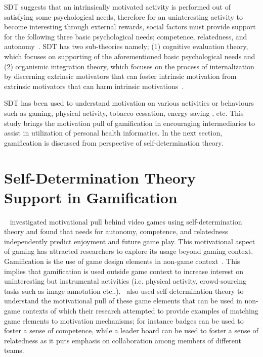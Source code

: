 SDT suggests that an intrinsically motivated activity is performed out of satisfying some psychological needs, therefore for an uninteresting activity to become interesting through external rewards, social factors must provide support for the following three basic psychological needs; competence, relatedness, and autonomy~\citep{ryan2000intrinsic}. SDT has two sub-theories namely; (1) cognitive evaluation theory, which focuses on supporting of the aforementioned basic psychological needs and (2) organismic integration theory, which focuses on the process of internalization by discerning extrinsic motivators that can foster intrinsic motivation from extrinsic motivators that can harm intrinsic motivations~\citep{ryan2000:self,lee2015:relating}.

SDT has been used to understand motivation on various activities or behaviours such as gaming\citep{ryan2006:motivationalpull}, physical activity\citep{power2011:obesity}, tobacco cessation\citep{williams2006:testing}, energy saving \citep{webb2013:self}, etc. This study brings the motivation pull of gamification in encouraging intermediaries to assist in utilization of personal health informatics. In the next section, gamification is discussed from perspective of self-determination theory.
\section{Self-Determination Theory Support in Gamification}
~\cite{ryan2006:motivationalpull} investigated motivational pull behind video games using self-determination theory and found that needs for autonomy, competence, and relatedness independently predict enjoyment and future game play. This motivational aspect of gaming has attracted researchers to explore its usage beyond gaming context. Gamification is the use of game design elements in non-game context~\citep{deterding2011game}. This implies that gamification is used outside game context to increase interest on uninteresting but instrumental activities (i.e. physical activity, crowd-sourcing tasks such as image annotation etc..).~\cite{sailer2013:psychological} also used self-determination theory to understand the motivational pull of these game elements that can be used in non-game contexts of which their research attempted to provide examples of matching game elements to motivation mechanisms; for instance badges can be used to foster a sense of competence, while a leader board can be used to foster a sense of relatedness as it puts emphasis on collaboration among members of different teams.

